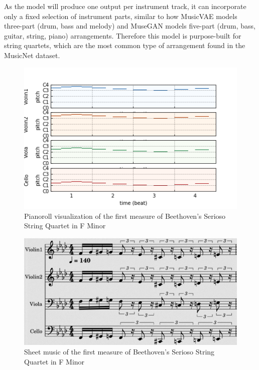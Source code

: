 \documentclass[sigconf,authorversion]{acmart}
\begin{document}
As the model will produce one output per instrument track, it can
incorporate only a fixed selection of instrument parts, similar to how
MusicVAE models three-part (drum, bass and melody)
\cite{roberts_hierarchical_2018} and MuseGAN models five-part (drum,
bass, guitar, string, piano) arrangements. Therefore this model is
purpose-built for string quartets, which are the most common type of
arrangement found in the MusicNet dataset.

\begin{figure}[h]
  \centering
  \includegraphics[width=\linewidth]{figures/first_bar.png}
  \caption{Pianoroll visualization of the first measure of
    Beethoven's Serioso String Quartet in F Minor}
  \label{pianoroll}
\end{figure}

\begin{figure}[h]
  \centering
  \includegraphics[width=\linewidth]{figures/first_bar_sheet.png}
  \caption{Sheet music of the first measure of Beethoven's Serioso
    String Quartet in F Minor}
  \label{sheet}
\end{figure}
\end{document}
